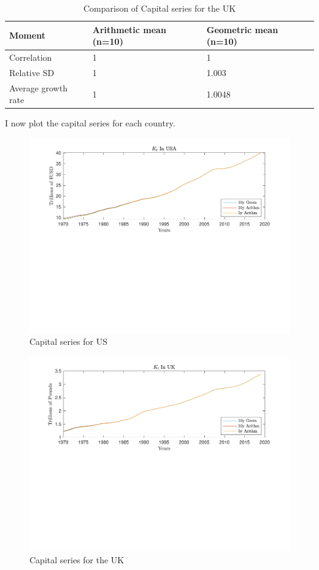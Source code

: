 \documentclass[12pt]{article}
\theoremstyle{mytheoremstyle}
\theoremstyle{mytheoremstyle}
\theoremstyle{myproblemstyle}
\begin{document}
\begin{table}[htbp]
    \centering
    \caption{Comparison of Capital series for the UK}
    \label{tab:UK_K}
    \begin{tabular}{@{}lll@{}}
    \toprule
    Moment & Arithmetic mean (n=10) & Geometric mean (n=10) \\ \midrule
    Correlation & 1 & 1 \\
    Relative SD & 1 & 1.003 \\
    Average growth rate & 1 & 1.0048 \\ \bottomrule
    \end{tabular}
    \end{table}

I now plot the capital series for each country.

\begin{figure}
    \includegraphics[trim = 0in 3.2in 0in 0in, clip, width=1\textwidth]{out/Capital_Series_US.pdf}
    \caption{Capital series for US}
\end{figure}

\begin{figure}[h]
    \includegraphics[trim = 0in 3.2in 0in 0in, clip, width=1\textwidth]{out/Capital_Series_uk.pdf}
    \caption{Capital series for the UK}
\end{figure}
\end{document}
